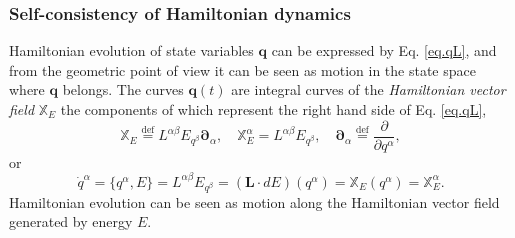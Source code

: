 \documentclass[
10pt, %
a4paper, %
oneside, %
headinclude,footinclude, %
BCOR5mm, %
]{scrartcl}
\newcommand{\XX}{\mathbf{X}}
\newcommand{\XXX}{\mathbb{X}}
\newcommand{\XXXX}{\boldsymbol{\mathbb{X}}}
\newcommand{\qq}{\mathbf{q}}
\newcommand{\LL}{\mathbf{L}}
\newcommand{\IP}[1]{{\color{Red}IP:\ \ #1}}
\newcommand{\pd}{\partial}
\begin{document}
\subsubsection{Self-consistency of Hamiltonian dynamics}
Hamiltonian evolution of state variables $\qq$ can be expressed by Eq. 
\eqref{eq.qL}, and from the geometric point of view it can be seen as motion in 
the state space where $\qq$ belongs. The curves $\qq(t)$ are integral curves of 
the \textit{Hamiltonian vector field} $ \XXXX_E $ the components of which 
represent the 
right hand side of Eq. \eqref{eq.qL}, 
\begin{equation}\label{eq.Ham.field}
	\XXXX_E \stackrel{\mathrm{def}}{=} L^{\alpha\beta}E_{q^\beta} \bm{\pd}_\alpha, \quad \XXX^\alpha_E = 
	L^{\alpha\beta}E_{q^\beta},
	\quad 
	\bm{\pd}_\alpha \stackrel{\mathrm{def}}{=} \frac{\partial}{\partial q^\alpha}, 
\end{equation}
or
\begin{equation}\label{eq.Ham.sys}
    \dot{q}^\alpha = \{q^\alpha,E\} = L^{\alpha\beta}E_{q^\beta} = (\LL \cdot dE) (q^\alpha) = \XXXX_E(q^\alpha) = \XXX^\alpha_E.
\end{equation}
Hamiltonian evolution can be seen as motion along the Hamiltonian vector field 
generated by energy $E$.
\end{document}
